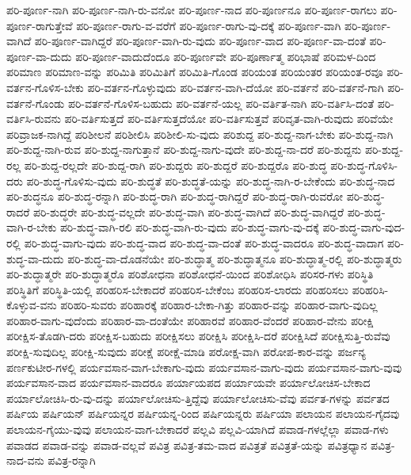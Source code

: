 {ಪರಿ-ಪೂರ್ಣ-ನಾಗಿ
ಪರಿ-ಪೂರ್ಣ-ನಾಗಿ-ರು-ವನೋ
ಪರಿ-ಪೂರ್ಣ-ನಾದ
ಪರಿ-ಪೂರ್ಣನೂ
ಪರಿ-ಪೂರ್ಣ-ರಾಗಲು
ಪರಿ-ಪೂರ್ಣ-ರಾಗುತ್ತೇವೆ
ಪರಿ-ಪೂರ್ಣ-ರಾಗು-ವ-ವರೆಗೆ
ಪರಿ-ಪೂರ್ಣ-ರಾಗು-ವು-ದಕ್ಕೆ
ಪರಿ-ಪೂರ್ಣ-ವಾಗಿ
ಪರಿ-ಪೂರ್ಣ-ವಾಗಿದೆ
ಪರಿ-ಪೂರ್ಣ-ವಾಗಿದ್ದರೆ
ಪರಿ-ಪೂರ್ಣ-ವಾಗಿ-ರು-ವುದು
ಪರಿ-ಪೂರ್ಣ-ವಾದ
ಪರಿ-ಪೂರ್ಣ-ವಾ-ದಂತೆ
ಪರಿ-ಪೂರ್ಣ-ವಾ-ದುದು
ಪರಿ-ಪೂರ್ಣ-ವಾದುದೆಂದೂ
ಪರಿ-ಪೂರ್ಣವೇ
ಪರಿ-ಪೂರ್ಣಾತ್ಮ
ಪರಿಭಾಷೆ
ಪರಿಮಳ-ದಿಂದ
ಪರಿಮಾಣ
ಪರಿಮಾಣ-ವನ್ನು
ಪರಿಮಿತಿ
ಪರಿಮಿತಿಗೆ
ಪರಿಮಿತಿ-ಗೊಂಡ
ಪರಿಯಂತ
ಪರಿಯಂತರ
ಪರಿಯಂತ-ರವೂ
ಪರಿ-ವರ್ತನ-ಗೊಳಿಸ-ಬೇಕು
ಪರಿ-ವರ್ತನ-ಗೊಳ್ಳುವುದು
ಪರಿ-ವರ್ತನ-ವಾಗಿ-ದೆಯೋ
ಪರಿ-ವರ್ತನೆ
ಪರಿ-ವರ್ತನೆ-ಗಾಗಿ
ಪರಿ-ವರ್ತನೆ-ಗೊಂಡು
ಪರಿ-ವರ್ತನೆ-ಗೊಳಿಸ-ಬಹುದು
ಪರಿ-ವರ್ತನೆ-ಯಲ್ಲ
ಪರಿ-ವರ್ತಿತ-ನಾಗಿ
ಪರಿ-ವರ್ತಿಸಿ-ದಂತೆ
ಪರಿ-ವರ್ತಿಸಿ-ರುವನು
ಪರಿ-ವರ್ತಿಸುತ್ತದೆ
ಪರಿ-ವರ್ತಿಸುತ್ತದೆಯೋ
ಪರಿ-ವರ್ತಿಸುತ್ತವೆ
ಪರಿವೃತ-ವಾಗಿ-ರುವುದು
ಪರಿವೆಯೇ
ಪರಿವ್ರಾಜಕ-ನಾಗಿದ್ದೆ
ಪರಿಶೀಲನೆ
ಪರಿಶೀಲಿಸಿ
ಪರಿಶೀಲಿ-ಸು-ವುದು
ಪರಿಶುದ್ದ
ಪರಿ-ಶುದ್ದ-ನಾಗ-ಬೇಕು
ಪರಿ-ಶುದ್ದ-ನಾಗಿ
ಪರಿ-ಶುದ್ದ-ನಾಗಿ-ರುವ
ಪರಿ-ಶುದ್ದ-ನಾಗುತ್ತಾನೆ
ಪರಿ-ಶುದ್ದ-ನಾಗು-ವುದೇ
ಪರಿ-ಶುದ್ದ-ನಾ-ದರೆ
ಪರಿ-ಶುದ್ದನು
ಪರಿ-ಶುದ್ದ-ರಲ್ಲ
ಪರಿ-ಶುದ್ದ-ರಲ್ಲದೇ
ಪರಿ-ಶುದ್ದ-ರಾಗಿ
ಪರಿ-ಶುದ್ದರು
ಪರಿ-ಶುದ್ದರೆ
ಪರಿ-ಶುದ್ದರೊ
ಪರಿ-ಶುದ್ಧ
ಪರಿ-ಶುದ್ಧ-ಗೊಳಿಸಿ-ದರು
ಪರಿ-ಶುದ್ಧ-ಗೊಳಿಸು-ವುದು
ಪರಿ-ಶುದ್ಧತೆ
ಪರಿ-ಶುದ್ಧತೆ-ಯನ್ನು
ಪರಿ-ಶುದ್ಧ-ನಾಗಿ-ರ-ಬೇಕೆಂದು
ಪರಿ-ಶುದ್ಧ-ನಾದ
ಪರಿ-ಶುದ್ಧನೂ
ಪರಿ-ಶುದ್ಧ-ರನ್ನಾಗಿ
ಪರಿ-ಶುದ್ಧ-ರಾಗಿ
ಪರಿ-ಶುದ್ಧ-ರಾಗಿದ್ದರೆ
ಪರಿ-ಶುದ್ಧ-ರಾಗಿ-ರುವರೋ
ಪರಿ-ಶುದ್ಧ-ರಾದರೆ
ಪರಿ-ಶುದ್ಧರೇ
ಪರಿ-ಶುದ್ಧ-ವಲ್ಲದೇ
ಪರಿ-ಶುದ್ಧ-ವಾಗಿ
ಪರಿ-ಶುದ್ಧ-ವಾಗಿದೆ
ಪರಿ-ಶುದ್ಧ-ವಾಗಿದ್ದರೆ
ಪರಿ-ಶುದ್ಧ-ವಾಗಿ-ರ-ಬೇಕು
ಪರಿ-ಶುದ್ಧ-ವಾಗಿ-ರಲಿ
ಪರಿ-ಶುದ್ಧ-ವಾಗಿ-ರು-ವುದು
ಪರಿ-ಶುದ್ಧ-ವಾಗು-ವು-ದಕ್ಕೆ
ಪರಿ-ಶುದ್ಧ-ವಾಗು-ವುದ-ರಲ್ಲಿ
ಪರಿ-ಶುದ್ಧ-ವಾಗು-ವುದು
ಪರಿ-ಶುದ್ಧ-ವಾದ
ಪರಿ-ಶುದ್ಧ-ವಾ-ದಂತೆ
ಪರಿ-ಶುದ್ಧ-ವಾದರೂ
ಪರಿ-ಶುದ್ಧ-ವಾದಾಗ
ಪರಿ-ಶುದ್ಧ-ವಾ-ದುದು
ಪರಿ-ಶುದ್ಧ-ವಾ-ದೊಡನೆಯೇ
ಪರಿ-ಶುದ್ಧಾತ್ಮ
ಪರಿ-ಶುದ್ಧಾತ್ಮನೂ
ಪರಿ-ಶುದ್ಧಾತ್ಮ-ರಲ್ಲಿ
ಪರಿ-ಶುದ್ಧಾತ್ಮರು
ಪರಿ-ಶುದ್ಧಾತ್ಮರೇ
ಪರಿ-ಶುದ್ಧಾತ್ಮರೊ
ಪರಿಶೋಧನಾ
ಪರಿಶೋಧನೆ-ಯಿಂದ
ಪರಿಶೋಧಿಸಿ
ಪರಿಸರ-ಗಳು
ಪರಿಸ್ಥಿತಿ
ಪರಿಸ್ಥಿತಿಗೆ
ಪರಿಸ್ಥಿತಿ-ಯಲ್ಲಿ
ಪರಿಹರಿಸ-ಬೇಕಾದರೆ
ಪರಿಹರಿಸ-ಬೇಕೆಂಬ
ಪರಿಹರಿಸ-ಲಾರದು
ಪರಿಹರಿಸಲು
ಪರಿಹರಿಸಿ-ಕೊಳ್ಳುವ-ವನು
ಪರಿಹರಿ-ಸುವರು
ಪರಿಹಾರಕ್ಕೆ
ಪರಿಹಾರ-ಬೇಕಾ-ಗಿತ್ತು
ಪರಿಹಾರ-ವನ್ನು
ಪರಿಹಾರ-ವಾಗು-ವುದಿಲ್ಲ
ಪರಿಹಾರ-ವಾಗು-ವುದೆಂದು
ಪರಿಹಾರ-ವಾ-ದಂತೆಯೇ
ಪರಿಹಾರವೆ
ಪರಿಹಾರ-ವೆಂದರೆ
ಪರಿಹಾರ-ವೇನು
ಪರೀಕ್ಷಿ
ಪರೀಕ್ಷಿಸ-ತೊಡಗಿ-ದರು
ಪರೀಕ್ಷಿಸ-ಬಹುದು
ಪರೀಕ್ಷಿಸಲು
ಪರೀಕ್ಷಿಸಿ
ಪರೀಕ್ಷಿಸಿ-ದರೆ
ಪರೀಕ್ಷಿಸಿದೆ
ಪರೀಕ್ಷಿಸುತ್ತಿ-ರುವೆವು
ಪರೀಕ್ಷಿ-ಸುವುದಿಲ್ಲ
ಪರೀಕ್ಷಿ-ಸುವುದು
ಪರೀಕ್ಷೆ
ಪರೀಕ್ಷೆ-ಮಾಡಿ
ಪರೋಕ್ಷ-ವಾಗಿ
ಪರೋಪ-ಕಾರ-ವನ್ನು
ಪರ್ಜನ್ಯ
ಪರ್ಣಕುಟೀರ-ಗಳಲ್ಲಿ
ಪರ್ಯವಸಾನ-ವಾಗ-ಬೇಕಾಗು-ವುದು
ಪರ್ಯವಸಾನ-ವಾಗು-ವುದು
ಪರ್ಯವಸಾನ-ವಾಗು-ವುವು
ಪರ್ಯವಸಾನ-ವಾದ
ಪರ್ಯವಸಾನ-ವಾದರೂ
ಪರ್ಯಾಯಪದ
ಪರ್ಯಾಯವೇ
ಪರ್ಯಾಲೋಚಿಸ-ಬೇಕಾದ
ಪರ್ಯಾಲೋಚಿಸಿ-ರು-ವು-ದನ್ನು
ಪರ್ಯಾಲೋಚಿಸು-ತ್ತಿದ್ದೆವು
ಪರ್ಯಾಲೋಚಿಸು-ವೆವು
ಪರ್ವತ-ಗಳನ್ನು
ಪರ್ವತದ
ಪರ್ಷಿಯ
ಪರ್ಷಿಯನ್
ಪರ್ಷಿಯನ್ನರ
ಪರ್ಷಿಯನ್ನ-ರಿಂದ
ಪರ್ಷಿಯನ್ನರು
ಪರ್ಷಿಯಾ
ಪಲಾಯನ
ಪಲಾಯನ-ಗೈದವು
ಪಲಾಯನ-ಗೈಯು-ವುವು
ಪಲಾಯನ-ವಾಗ-ಬೇಕಾದರೆ
ಪಲ್ಲವಿ
ಪಲ್ಲವಿ-ಯಾಗಿದೆ
ಪವಾಡ-ಗಳಲ್ಲೆಲ್ಲಾ
ಪವಾಡ-ಗಳು
ಪವಾಡದ
ಪವಾಡ-ವನ್ನು
ಪವಾಡ-ವಲ್ಲವೆ
ಪವಿತ್ರ
ಪವಿತ್ರ-ತಮ-ವಾದ
ಪವಿತ್ರತೆ
ಪವಿತ್ರತೆ-ಯನ್ನು
ಪವಿತ್ರಧ್ಯಾನ
ಪವಿತ್ರ-ನಾದ-ವನು
ಪವಿತ್ರ-ರನ್ನಾಗಿ
}
